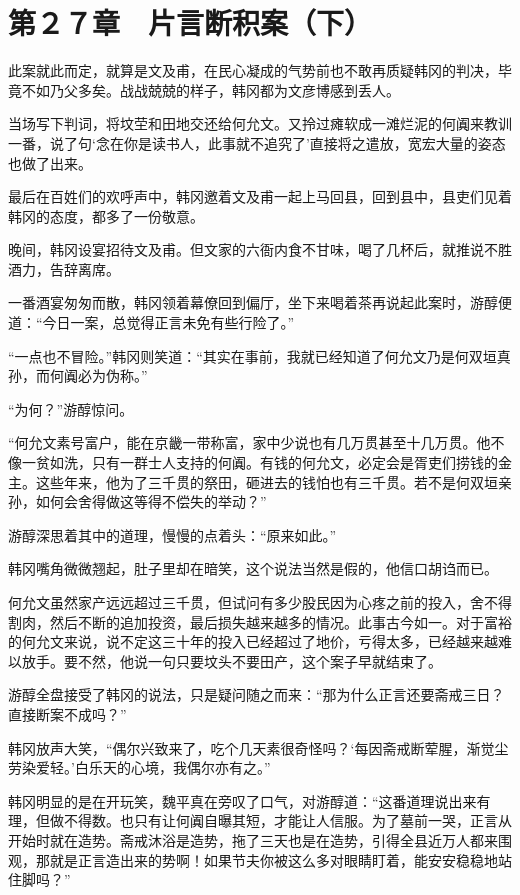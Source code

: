 \section{第２７章　片言断积案（下）}

此案就此而定，就算是文及甫，在民心凝成的气势前也不敢再质疑韩冈的判决，毕竟不如乃父多矣。战战兢兢的样子，韩冈都为文彦博感到丢人。

当场写下判词，将坟茔和田地交还给何允文。又拎过瘫软成一滩烂泥的何阗来教训一番，说了句‘念在你是读书人，此事就不追究了’直接将之遣放，宽宏大量的姿态也做了出来。

最后在百姓们的欢呼声中，韩冈邀着文及甫一起上马回县，回到县中，县吏们见着韩冈的态度，都多了一份敬意。

晚间，韩冈设宴招待文及甫。但文家的六衙内食不甘味，喝了几杯后，就推说不胜酒力，告辞离席。

一番酒宴匆匆而散，韩冈领着幕僚回到偏厅，坐下来喝着茶再说起此案时，游醇便道：“今日一案，总觉得正言未免有些行险了。”

“一点也不冒险。”韩冈则笑道：“其实在事前，我就已经知道了何允文乃是何双垣真孙，而何阗必为伪称。”

“为何？”游醇惊问。

“何允文素号富户，能在京畿一带称富，家中少说也有几万贯甚至十几万贯。他不像一贫如洗，只有一群士人支持的何阗。有钱的何允文，必定会是胥吏们捞钱的金主。这些年来，他为了三千贯的祭田，砸进去的钱怕也有三千贯。若不是何双垣亲孙，如何会舍得做这等得不偿失的举动？”

游醇深思着其中的道理，慢慢的点着头：“原来如此。”

韩冈嘴角微微翘起，肚子里却在暗笑，这个说法当然是假的，他信口胡诌而已。

何允文虽然家产远远超过三千贯，但试问有多少股民因为心疼之前的投入，舍不得割肉，然后不断的追加投资，最后损失越来越多的情况。此事古今如一。对于富裕的何允文来说，说不定这三十年的投入已经超过了地价，亏得太多，已经越来越难以放手。要不然，他说一句只要坟头不要田产，这个案子早就结束了。

游醇全盘接受了韩冈的说法，只是疑问随之而来：“那为什么正言还要斋戒三日？直接断案不成吗？”

韩冈放声大笑，“偶尔兴致来了，吃个几天素很奇怪吗？‘每因斋戒断荤腥，渐觉尘劳染爱轻。’白乐天的心境，我偶尔亦有之。”

韩冈明显的是在开玩笑，魏平真在旁叹了口气，对游醇道：“这番道理说出来有理，但做不得数。也只有让何阗自曝其短，才能让人信服。为了墓前一哭，正言从开始时就在造势。斋戒沐浴是造势，拖了三天也是在造势，引得全县近万人都来围观，那就是正言造出来的势啊！如果节夫你被这么多对眼睛盯着，能安安稳稳地站住脚吗？”

